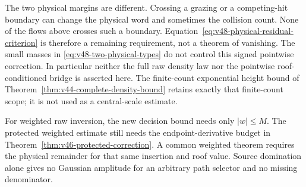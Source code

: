 The two physical margins are different. Crossing a grazing or a
competing-hit boundary can change the physical word and sometimes
the collision count. None of the flows above crosses such a boundary.
Equation~\eqref{eq:v48-physical-residual-criterion} is therefore a
remaining requirement, not a theorem of vanishing. The small masses
in \eqref{eq:v48-two-physical-types} do not control this signed
pointwise correction. In particular neither the full raw density
law nor the pointwise roof-conditioned bridge is asserted here.
The finite-count exponential height bound of
Theorem~\ref{thm:v44-complete-density-bound} retains exactly that
finite-count scope; it is not used as a central-scale estimate.

For weighted raw inversion, the new decision bound needs only
$|w|\le M$. The protected weighted estimate still needs the
endpoint-derivative budget in
Theorem~\ref{thm:v46-protected-correction}. A common weighted theorem
requires the physical remainder for that same insertion and roof
value. Source domination alone gives no Gaussian amplitude for an
arbitrary path selector and no missing denominator.
